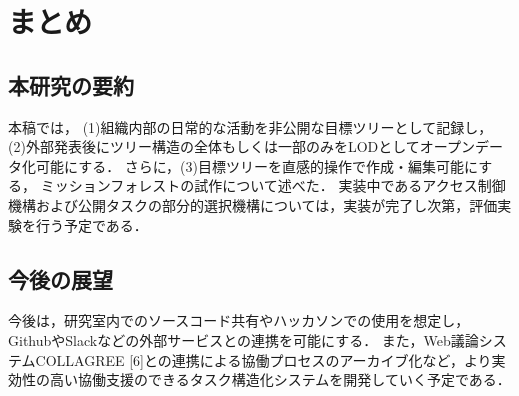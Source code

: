 \chapter{まとめ}

\section{本研究の要約}
本稿では，
(1)組織内部の日常的な活動を非公開な目標ツリーとして記録し，
(2)外部発表後にツリー構造の全体もしくは一部のみをLODとしてオープンデータ化可能にする．
さらに，(3)目標ツリーを直感的操作で作成・編集可能にする，
ミッションフォレストの試作について述べた．
実装中であるアクセス制御機構および公開タスクの部分的選択機構については，実装が完了し次第，評価実験を行う予定である．

\section{今後の展望}
今後は，研究室内でのソースコード共有やハッカソンでの使用を想定し，GithubやSlackなどの外部サービスとの連携を可能にする．
また，Web議論システムCOLLAGREE [6]との連携による協働プロセスのアーカイブ化など，より実効性の高い協働支援のできるタスク構造化システムを開発していく予定である．
